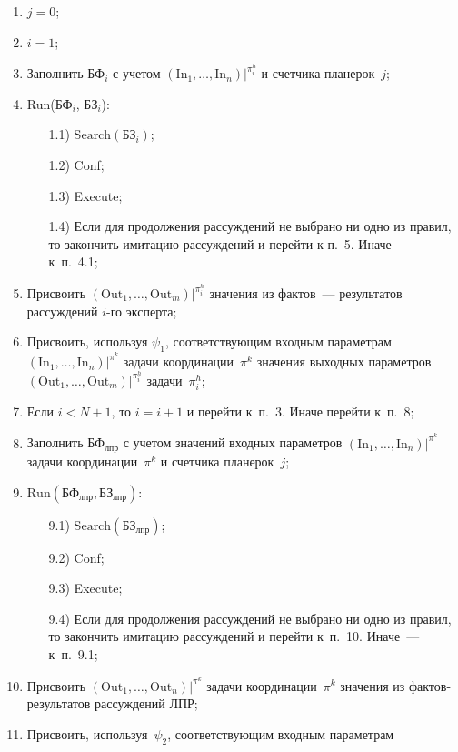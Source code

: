 \begin{multicols}{2}
  \noindent
  \begin{enumerate}[1)]
\item $j = 0$;
\item $i = 1$;
\item Заполнить БФ$_i$ с учетом $(\mathrm{In}_1, \ldots , \mathrm{In}_n)\vert^{\pi_i^h}$ и счетчика 
планерок~$j$;
\item Run(БФ$_i$,  БЗ$_i$):
\begin{itemize}
\item[1.1)] $\mathrm{Search}(\mathrm{БЗ}_i)$;
\item[1.2)] Conf;
\item[1.3)] Execute;
\item[1.4)] Если для продолжения рассуждений не выбрано ни одно из 
правил, то закончить имитацию рассуждений и перейти к п.~5. Иначе~---  
к~п.~4.1;
\end{itemize}
\item Присвоить $(\mathrm{Out}_1, \ldots , \mathrm{Out}_m)\vert^{\pi_i^h}$ значения из фактов~--- 
результатов рассуждений $i$-го эксперта;
\item Присвоить, используя $\psi_1$, соответствующим входным параметрам 
$(\mathrm{In}_1, \ldots , \mathrm{In}_n)\vert^{\pi^k}$ задачи координации~$\pi^k$ значения 
выходных па\-ра\-мет\-ров $(\mathrm{Out}_1, \ldots , \mathrm{Out}_m)\vert^{\pi_i^h}$ задачи~$\pi_i^h$;
\item Если $i < N + 1$, то $i = i + 1$ и перейти к~п.~3. Иначе перейти к~п.~8;
\item Заполнить БФ$_{\mathrm{лпр}}$ с учетом значений входных параметров 
$(\mathrm{In}_1, \ldots ,\mathrm{In}_n)\vert^{\pi^k}$ задачи координации~$\pi^k$ и счетчика 
планерок~$j$;
\item $\mathrm{Run}(\mathrm{БФ}_{\mathrm{лпр}}, \mathrm{БЗ}_{\mathrm{лпр}})$:
\begin{itemize}
\item[9.1)] $\mathrm{Search}(\mathrm{БЗ}_{\mathrm{лпр}})$;
\item[9.2)] Conf;
\item[9.3)] Execute;
\item[9.4)] Если для продолжения рассуждений не выбрано ни одно из 
правил, то закончить имитацию рассуждений и перейти к~п.~10. Иначе~--- 
к~п.~9.1;
\end{itemize}
\item Присвоить $(\mathrm{Out}_1, \ldots , \mathrm{Out}_n)\vert^{\pi^k}$ задачи 
координации~$\pi^k$ значения из фактов-результатов рассуждений ЛПР;
\item Присвоить, используя~$\psi_2$, соответствующим входным параметрам 

\end{enumerate}
\end{multicols}
